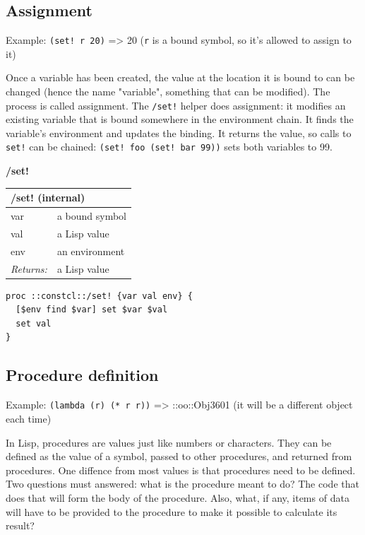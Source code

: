 \documentclass[twoside,9pt]{report}
\begin{document}
\subsection{Assignment}
\label{assignment}

Example: \texttt{(set! r 20)} => 20 (\texttt{r} is a bound symbol, so it's allowed to assign to it)


Once a variable has been created, the value at the location it is bound to can be changed (hence the name "variable", something that can be modified). The process is called assignment. The \texttt{/set!} helper does assignment: it modifies an existing variable that is bound somewhere in the environment chain. It finds the variable's environment and updates the binding. It returns the value, so calls to \texttt{set!} can be chained: \texttt{(set! foo (set! bar 99))} sets both variables to 99.


\textbf{/set!}

\begin{tabular}{ |l l| }
\hline
\multicolumn{2}{|l|}{/set! (internal)} \\
\hline
var & a bound symbol \\
val & a Lisp value \\
env & an environment \\
\textit{Returns:} & a Lisp value \\
\hline
\end{tabular}

\noindent\makebox[\linewidth]{\rule{\linewidth}{0.4pt}}
\begin{lstlisting}
proc ::constcl::/set! {var val env} {
  [$env find $var] set $var $val
  set val
}
\end{lstlisting}
\noindent\makebox[\linewidth]{\rule{\linewidth}{0.4pt}}
\subsection{Procedure definition}
\label{procedure-definition}

Example: \texttt{(lambda (r) (* r r))} => ::oo::Obj3601 (it will be a different object each time)


In Lisp, procedures are values just like numbers or characters. They can be defined as the value of a symbol, passed to other procedures, and returned from procedures. One diffence from most values is that procedures need to be defined. Two questions must answered: what is the procedure meant to do? The code that does that will form the body of the procedure. Also, what, if any, items of data will have to be provided to the procedure to make it possible to calculate its result?
\end{document}
